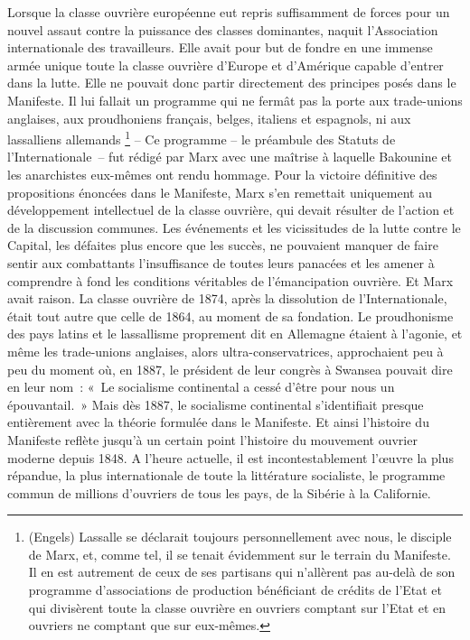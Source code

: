\documentclass[french,twoside]{book} %
\begin{document}
Lorsque la classe ouvrière européenne eut repris suffisamment de forces pour un nouvel assaut contre la puissance des classes dominantes, naquit l’Association internationale des travailleurs. Elle avait pour but de fondre en une immense armée unique toute la classe ouvrière d’Europe et d’Amérique capable d’entrer dans la lutte. Elle ne pouvait donc partir directement des principes posés dans le Manifeste. Il lui fallait un programme qui ne fermât pas la porte aux trade-unions anglaises, aux proudhoniens français, belges, italiens et espagnols, ni aux lassalliens allemands \footnote{(Engels) Lassalle se déclarait toujours personnellement avec nous, le disciple de Marx, et, comme tel, il se tenait évidemment sur le terrain du Manifeste. Il en est autrement de ceux de ses partisans qui n’allèrent pas au-delà de son programme d’associations de production bénéficiant de crédits de l’Etat et qui divisèrent toute la classe ouvrière en ouvriers comptant sur l’Etat et en ouvriers ne comptant que sur eux-mêmes.} – Ce programme – le préambule des Statuts de l’Internationale – fut rédigé par Marx avec une maîtrise à laquelle Bakounine et les anarchistes eux-mêmes ont rendu hommage. Pour la victoire définitive des propositions énoncées dans le Manifeste, Marx s’en remettait uniquement au développement intellectuel de la classe ouvrière, qui devait résulter de l’action et de la discussion communes. Les événements et les vicissitudes de la lutte contre le Capital, les défaites plus encore que les succès, ne pouvaient manquer de faire sentir aux combattants l’insuffisance de toutes leurs panacées et les amener à comprendre à fond les conditions véritables de l’émancipation ouvrière. Et Marx avait raison. La classe ouvrière de 1874, après la dissolution de l’Internationale, était tout autre que celle de 1864, au moment de sa fondation. Le proudhonisme des pays latins et le lassallisme proprement dit en Allemagne étaient à l’agonie, et même les trade-unions anglaises, alors ultra-conservatrices, approchaient peu à peu du moment où, en 1887, le président de leur congrès à Swansea pouvait dire en leur nom : « Le socialisme continental a cessé d’être pour nous un épouvantail. » Mais dès 1887, le socialisme continental s’identifiait presque entièrement avec la théorie formulée dans le Manifeste. Et ainsi l’histoire du Manifeste reflète jusqu’à un certain point l’histoire du mouvement ouvrier moderne depuis 1848. A l’heure actuelle, il est incontestablement l’œuvre la plus répandue, la plus internationale de toute la littérature socialiste, le programme commun de millions d’ouvriers de tous les pays, de la Sibérie à la Californie.\par
\end{document}
